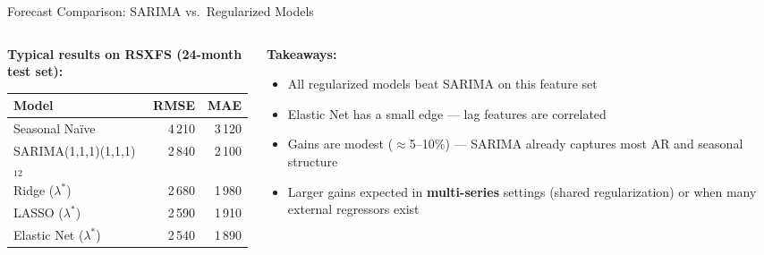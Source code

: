 \documentclass[aspectratio=169, 10pt]{beamer}
\begin{document}
\begin{frame}{Forecast Comparison: SARIMA vs.\ Regularized Models}
  \begin{columns}[T]
    \begin{column}{0.52\textwidth}
      \textbf{Typical results on RSXFS (24-month test set):}
      \begin{center}
      \footnotesize
      \begin{tabular}{lrr}
        \toprule
        \textbf{Model} & \textbf{RMSE} & \textbf{MAE} \\
        \midrule
        Seasonal Naïve  & 4\,210 & 3\,120 \\
        SARIMA(1,1,1)(1,1,1)$_{12}$ & 2\,840 & 2\,100 \\
        Ridge ($\lambda^*$) & 2\,680 & 1\,980 \\
        LASSO ($\lambda^*$) & 2\,590 & 1\,910 \\
        Elastic Net ($\lambda^*$) & 2\,540 & 1\,890 \\
        \bottomrule
      \end{tabular}
      \end{center}
    \end{column}
    \begin{column}{0.44\textwidth}
      \textbf{Takeaways:}
      \begin{itemize}
        \item All regularized models beat SARIMA on this feature set
        \item Elastic Net has a small edge — lag features are correlated
        \item Gains are modest ($\approx$5--10\%) — SARIMA already captures
              most AR and seasonal structure
        \item Larger gains expected in \textbf{multi-series} settings
              (shared regularization) or when many external regressors exist
      \end{itemize}
    \end{column}
  \end{columns}
\end{frame}

\end{document}
